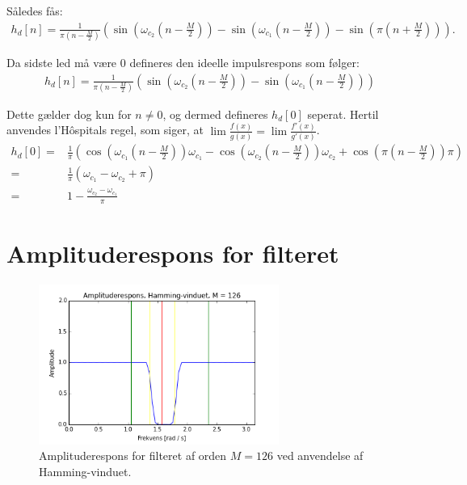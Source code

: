 Således fås:
\begin{align*}
h_d[n]= \frac{1}{\pi \left(n-\frac{M}{2}\right)} \left(\sin\left(\omega_{c_2} \left(n-\frac{M}{2}\right)\right) - \sin\left(\omega_{c_1} \left(n-\frac{M}{2}\right)\right) - \sin\left( \pi\left( n + \frac{M}{2} \right) \right) \right).
\end{align*}

Da sidste led må være $0$ defineres den ideelle impulsrespons som følger:
\begin{align*}
h_d[n]= \frac{1}{\pi \left(n-\frac{M}{2}\right)} \left(\sin\left(\omega_{c_2} \left(n-\frac{M}{2}\right)\right) - \sin\left(\omega_{c_1} \left(n-\frac{M}{2}\right)\right)\right)
\end{align*}

Dette gælder dog kun for $n \neq 0$, og dermed defineres $h_d[0]$ seperat. Hertil anvendes l'Hôspitals regel, som siger, at $\lim \frac{f(x)}{g(x)}=\lim \frac{f'(x)}{g'(x)}$.
\begin{align*}
h_d[0]=& \frac{1}{\pi} \left( \cos\left( \omega_{c_1} \left(n-\frac{M}{2}\right) \right)\omega_{c_1} - \cos\left( \omega_{c_2} \left(n-\frac{M}{2}\right) \right)\omega_{c_2} +  \cos\left(\pi \left( n- \frac{M}{2}\right) \right) \pi \right) \\
=& \frac{1}{\pi}\left( \omega_{c_1} - \omega_{c_2} + \pi \right) \\
=& 1 - \frac{\omega_{c_2}-\omega_{c_1}}{\pi}
\end{align*}

\section{Amplituderespons for filteret} \label{app2}
\begin{figure}[H]
\centering
\includegraphics[width=0.7\textwidth]{figures/Filter/Filter_Hamming_126.png}
\caption{Amplituderespons for filteret af orden $M=126$ ved anvendelse af Hamming-vinduet.}
\label{fig:amplituderespons}
\end{figure}